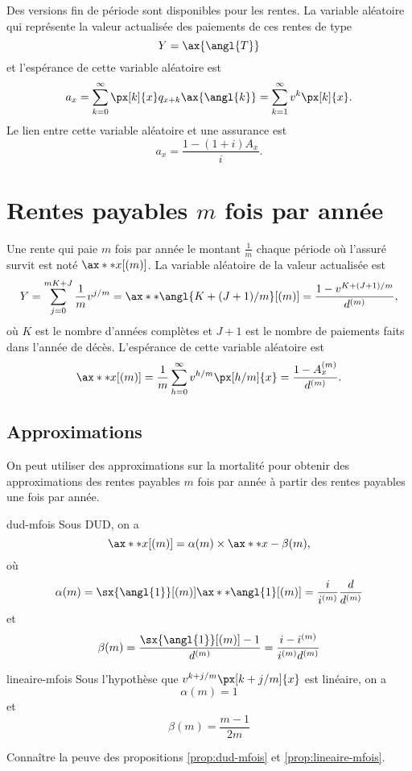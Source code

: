 Des versions fin de période sont disponibles pour les rentes. La variable aléatoire qui représente la valeur actualisée des paiements de ces rentes de type
$$ Y = \ax{\angl{T}}$$
et l'espérance de cette variable aléatoire est 
$$a_x = \sum_{k = 0}^{\infty} \px[k]{x} q_{x + k} \ax{\angl{k}} = \sum_{k = 1}^{\infty} v^k \px[k]{x}.$$
Le lien entre cette variable aléatoire et une assurance est 
$$a_x = \frac{1 - (1 + i)A_x}{i}.$$

\section{Rentes payables $m$ fois par année}

\begin{definition}{}{}
	Une rente qui paie $m$ fois par année le montant $\frac{1}{m}$ chaque période où l'assuré survit est noté $\ax**{x}[(m)]$. La variable aléatoire de la valeur actualisée est
	$$Y = \sum_{j = 0}^{mK + J}\frac{1}{m}v^{j/m} = \ax**{\angl{K + (J + 1)/m}}[(m)] = \frac{1 - v^{K + (J + 1)/m}}{d^{(m)}},$$
	où $K$ est le nombre d'années complètes et $J + 1$ est le nombre de paiements faits dans l'année de décès. L'espérance de cette variable aléatoire est 
	$$\ax**{x}[(m)] = \frac{1}{m}\sum_{h = 0}^{\infty} v^{h/m}\px[h/m]{x} = \frac{1 - A_x^{(m)}}{d^{(m)}}.$$
\end{definition}

\subsection{Approximations}

On peut utiliser des approximations sur la mortalité pour obtenir des approximations des rentes payables $m$ fois par année à partir des rentes payables une fois par année. 

\begin{proposition}{}{dud-mfois}
	Sous DUD, on a 
	$$\ax**{x}[(m)] = \alpha(m)\times \ax**{x} - \beta(m),$$
	où 
	$$\alpha(m) = \sx{\angl{1}}[(m)]\ax**{\angl{1}}[(m)] = \frac{i}{i ^{(m)}} \frac{d}{d ^{(m)}}$$
	et
	$$\beta(m) = \frac{\sx{\angl{1}}[(m)] - 1}{d^{(m)}} = \frac{i - i^{(m)}}{i^{(m)}d^{(m)}}$$
\end{proposition}

\begin{proposition}{}{lineaire-mfois}
	Sous l'hypothèse que $v^{k + j/m}\px[k + j/m]{x}$ est linéaire, on a 
	$$\alpha(m) = 1$$
	et
	$$\beta(m) = \frac{m-1}{2m}$$
\end{proposition}

Connaître la peuve des propositions \ref{prop:dud-mfois} et \ref{prop:lineaire-mfois}.

